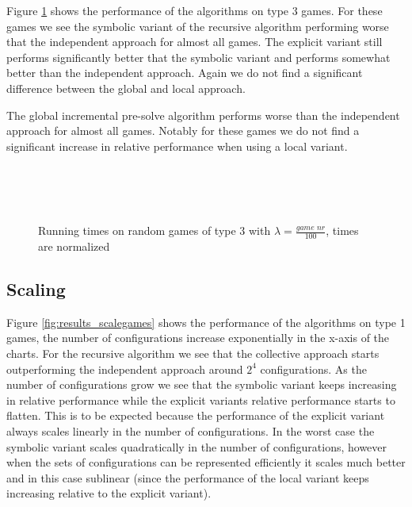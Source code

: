 Figure \ref{fig:results_type3} shows the performance of the algorithms on type 3 games. For these games we see the symbolic variant of the recursive algorithm performing worse that the independent approach for almost all games. The explicit variant still performs significantly better that the symbolic variant and performs somewhat better than the independent approach. Again we do not find a significant difference between the global and local approach.

The global incremental pre-solve algorithm performs worse than the independent approach for almost all games. Notably for these games we do not find a significant increase in relative performance when using a local variant.

\begin{figure}[H]
	\centering
	\begin{multicols}{2}
		\\\vfill
		\\
		\\\vfill
		
	\end{multicols}
	\caption{Running times on random games of type 3 with $\lambda = \frac{\textit{game nr}}{100}$, times are normalized}
	\label{fig:results_type3}
\end{figure}%

\subsection{Scaling}
Figure \ref{fig:results_scalegames} shows the performance of the algorithms on type 1 games, the number of configurations increase exponentially in the x-axis of the charts. For the recursive algorithm we see that the collective approach starts outperforming the independent approach around $2^4$ configurations. As the number of configurations grow we see that the symbolic variant keeps increasing in relative performance while the explicit variants relative performance starts to flatten. This is to be expected because the performance of the explicit variant always scales linearly in the number of configurations. In the worst case the symbolic variant scales quadratically in the number of configurations, however when the sets of configurations can be represented efficiently it scales much better and in this case sublinear (since the performance of the local variant keeps increasing relative to the explicit variant).

